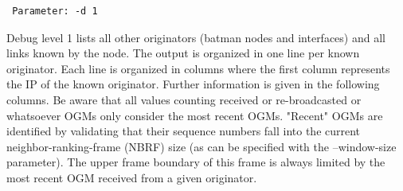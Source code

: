 \documentclass[11pt]{article}
\begin{document}
\label{sec:debug-level-1}

\begin{small}
\begin{verbatim}
 Parameter: -d 1
\end{verbatim}
\end{small}

Debug level 1 lists all other originators (batman nodes and interfaces) and all links known by the node.
%
The output is organized in one line per known originator. Each line is organized in columns where the first column represents the IP of the known originator. Further information is given in the following columns.
%
Be aware that all values counting received or re-broadcasted or whatsoever OGMs only consider the most recent OGMs. "Recent" OGMs are identified by validating that their sequence numbers fall into the current neighbor-ranking-frame (NBRF) size (as can be specified with the --window-size parameter). The upper frame boundary of this frame is always limited by the most recent OGM received from a given originator.
\end{document}
